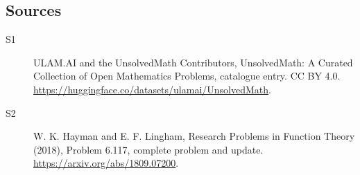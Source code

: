 \documentclass[11pt]{article}
\begin{document}
\subsection{Sources}
\begin{description}
\item[\hypertarget{source:statement:1}{S1}] ULAM.AI and the UnsolvedMath Contributors, UnsolvedMath: A Curated Collection of Open Mathematics Problems, catalogue entry. CC BY 4.0. \url{https://huggingface.co/datasets/ulamai/UnsolvedMath}.
\item[\hypertarget{source:statement:2}{S2}] W. K. Hayman and E. F. Lingham, Research Problems in Function Theory (2018), Problem 6.117, complete problem and update. \url{https://arxiv.org/abs/1809.07200}.
\end{description}
\label{end:statement}
\end{document}
